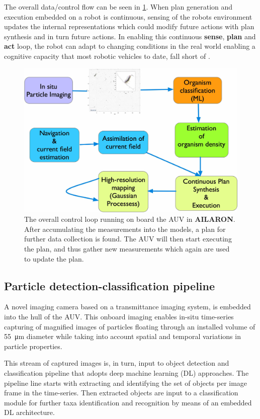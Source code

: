 \documentclass[conference]{IEEEtran}
\def\proje{{\textbf{AILARON}}}
\begin{document}
The overall data/control flow can be seen in \cref{fig:sensePlanActLoop}.
When plan generation and execution embedded on a robot is continuous, sensing of the robots environment updates the internal representations which could modify future actions with plan synthesis and in turn future actions.
In enabling this continuous \textbf{sense},
\textbf{plan} and \textbf{act} loop, the robot can adapt to changing
conditions in the real world enabling a cognitive capacity that most
robotic vehicles to date, fall short of \cite{rajan12}.

\begin{figure}[tbp]
\centerline{\includegraphics[width=0.8\linewidth]{figures/workflow-simplified.jpg}}
\caption{The overall control loop running on board the AUV in \proje. After accumulating the measurements into the models, a plan for further data collection is found. The AUV will then start executing the plan, and thus gather new measurements which again are used to update the plan.}
\label{fig:sensePlanActLoop}
\end{figure}

\subsection{Particle detection-classification pipeline}

A novel imaging camera \cite{Davies2017a} based on a transmittance
imaging system, is embedded into the hull of the AUV. This onboard
imaging enables in-situ time-series capturing of magnified images of
particles floating through an installed volume of \SI{55}{\micro\meter}
diameter while taking into account spatial and temporal variations in
particle properties.

This stream of captured images is, in turn, input to object detection and classification pipeline that adopts deep machine learning (DL) approaches. The pipeline line starts with extracting and identifying the set of objects per image frame in the time-series. Then extracted objects are input to a classification module for further taxa identification and recognition by means of an embedded DL architecture. 
\end{document}
